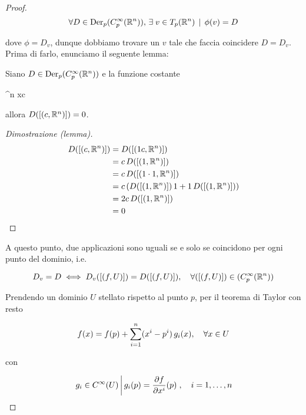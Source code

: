\begin{proof}
	\begin{equation}
		\forall D \in \operatorname{Der}_{p} (C_{p}^{\infty}(\mathbb{R}^{n})), \, \exists \; v \in T_{p}(\mathbb{R}^{n}) \, \mid \, \phi(v) = D
	\end{equation}
	
	dove $ \phi = D_{v} $, dunque dobbiamo trovare un $ v $ tale che faccia coincidere $ D = D_{v} $.\\
	Prima di farlo, enunciamo il seguente lemma:

	\begin{lemma}
		Siano $ D \in \operatorname{Der}_{p} (C_{p}^{\infty}(\mathbb{R}^{n})) $ e la funzione costante
		
			{\R^{n}}{\R}
			{x}{c}
	
		allora $ D([(c,\mathbb{R}^{n})]) = 0 $.
	\end{lemma}

	\begin{proof}[Dimostrazione (lemma)]
		\begin{align}
			\begin{split}
				D([(c,\mathbb{R}^{n})]) &= D([(1 c,\mathbb{R}^{n})])\\
				&= c \, D([(1,\mathbb{R}^{n})])\\
				&= c \, D([(1 \cdot 1,\mathbb{R}^{n})])\\
				&= c \, ( D([(1,\mathbb{R}^{n})]) \, 1 + 1 \, D([(1,\mathbb{R}^{n})]) )\\
				&= 2 c \, D([(1,\mathbb{R}^{n})])\\
				&= 0
			\end{split}
		\end{align}
	\end{proof}

	A questo punto, due applicazioni sono uguali se e solo se coincidono per ogni punto del dominio, i.e.
	
	\begin{equation}
		D_{v} = D \iff D_{v}([(f,U)]) = D([(f,U)]), \quad \forall ([(f,U)]) \in (C_{p}^{\infty}(\mathbb{R}^{n}))
	\end{equation}

	Prendendo un dominio $ U $ stellato rispetto al punto $ p $, per il teorema di Taylor con resto
	
	\begin{equation}
		f(x) = f(p) + \sum_{i=1}^{n} (x^{i}-p^{i}) \, g_{i}(x) \qcomma \forall x \in U
	\end{equation}

	con
	
	\begin{equation}
		\left. g_{i} \in C^{\infty}(U) \, \middle| \, g_{i}(p) = \dfrac{\partial f}{\partial x^{i}} (p) \right., \quad i=1,\dots,n
	\end{equation}


\end{proof}
